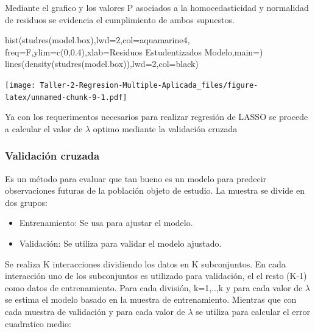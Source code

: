\documentclass[
]{article}
\newenvironment{Shaded}{\begin{snugshade}}{\end{snugshade}}
\newcommand{\AttributeTok}[1]{\textcolor[rgb]{0.77,0.63,0.00}{#1}}
\newcommand{\DecValTok}[1]{\textcolor[rgb]{0.00,0.00,0.81}{#1}}
\newcommand{\FloatTok}[1]{\textcolor[rgb]{0.00,0.00,0.81}{#1}}
\newcommand{\FunctionTok}[1]{\textcolor[rgb]{0.00,0.00,0.00}{#1}}
\newcommand{\NormalTok}[1]{#1}
\newcommand{\StringTok}[1]{\textcolor[rgb]{0.31,0.60,0.02}{#1}}
\begin{document}
Mediante el grafico y los valores P asociados a la homocedasticidad y
normalidad de residuos se evidencia el cumplimiento de ambos supuestos.

\begin{Shaded}
\begin{Highlighting}[]
\FunctionTok{hist}\NormalTok{(}\FunctionTok{studres}\NormalTok{(model.box),}\AttributeTok{lwd=}\DecValTok{2}\NormalTok{,}\AttributeTok{col=}\StringTok{\textquotesingle{}aquamarine4\textquotesingle{}}\NormalTok{,}
\AttributeTok{freq=}\NormalTok{F,}\AttributeTok{ylim=}\FunctionTok{c}\NormalTok{(}\DecValTok{0}\NormalTok{,}\FloatTok{0.4}\NormalTok{),}\AttributeTok{xlab=}\StringTok{\textquotesingle{}Residuos Estudentizados Modelo\textquotesingle{}}\NormalTok{,}\AttributeTok{main=}\StringTok{\textquotesingle{}\textquotesingle{}}\NormalTok{)}
\FunctionTok{lines}\NormalTok{(}\FunctionTok{density}\NormalTok{(}\FunctionTok{studres}\NormalTok{(model.box)),}\AttributeTok{lwd=}\DecValTok{2}\NormalTok{,}\AttributeTok{col=}\StringTok{\textquotesingle{}black\textquotesingle{}}\NormalTok{)}
\end{Highlighting}
\end{Shaded}

\texttt{[image: Taller-2-Regresion-Multiple-Aplicada\_files/figure-latex/unnamed-chunk-9-1.pdf]}

Ya con los requerimentos necesarios para realizar regresión de LASSO se
procede a calcular el valor de \(\lambda\) optimo mediante la validación
cruzada

\hypertarget{validaciuxf3n-cruzada}{%
\subsubsection{Validación cruzada}\label{validaciuxf3n-cruzada}}

Es un método para evaluar que tan bueno es un modelo para predecir
observaciones futuras de la población objeto de estudio. La muestra se
divide en dos grupos:

\begin{itemize}
\item
  Entrenamiento: Se usa para ajustar el modelo.
\item
  Validación: Se utiliza para validar el modelo ajustado.
\end{itemize}

Se realiza K interacciones dividiendo los datos en K subconjuntos. En
cada interacción uno de los subconjuntos es utilizado para validación,
el el resto (K-1) como datos de entrenamiento. Para cada división,
k=1,..,k y para cada valor de \(\lambda\) se estima el modelo basado en
la muestra de entrenamiento. Mientras que con cada muestra de validación
y para cada valor de \(\lambda\) se utiliza para calcular el error
cuadratico medio:
\end{document}
